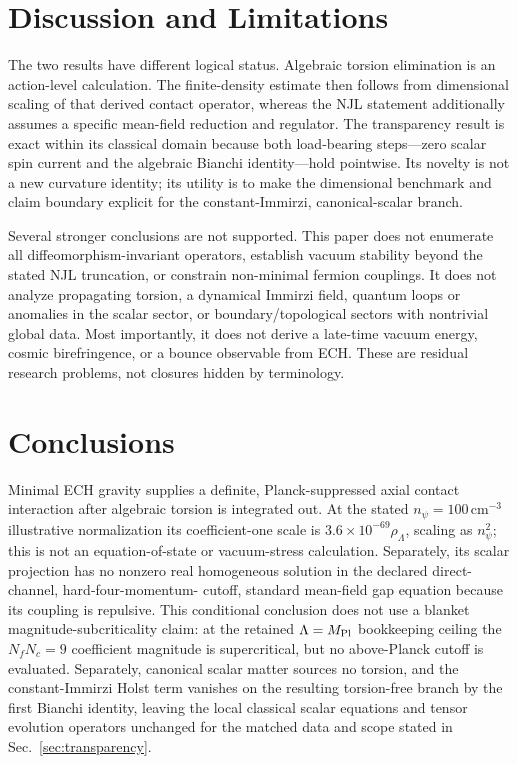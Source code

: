 \documentclass[aps,prd,twocolumn,superscriptaddress,preprintnumbers,nofootinbib,longbibliography,floatfix]{revtex4-2}
\begin{document}
\section{Discussion and Limitations}\label{sec:discussion}

The two results have different logical status.  Algebraic torsion elimination
is an action-level calculation.  The finite-density estimate then follows
from dimensional scaling of that derived contact operator, whereas the NJL
statement additionally assumes a specific mean-field reduction and regulator.
The transparency result is exact within its classical domain because both
load-bearing steps---zero scalar spin current and the algebraic Bianchi
identity---hold pointwise.  Its novelty is not a new curvature identity; its
utility is to make the dimensional benchmark and claim boundary explicit
for the constant-Immirzi, canonical-scalar branch.

Several stronger conclusions are not supported.  This paper does not
enumerate all diffeomorphism-invariant operators, establish vacuum stability
beyond the stated NJL truncation, or constrain non-minimal fermion couplings.
It does not analyze propagating torsion, a dynamical Immirzi field, quantum
loops or anomalies in the scalar sector, or boundary/topological sectors with
nontrivial global data.  Most importantly, it does not derive a late-time
vacuum energy, cosmic birefringence, or a bounce observable from ECH.  These
are residual research problems, not closures hidden by terminology.

\section{Conclusions}\label{sec:conclusions}

Minimal ECH gravity supplies a definite, Planck-suppressed axial contact
interaction after algebraic torsion is integrated out.  At the stated
$n_\psi=100\,\mathrm{cm}^{-3}$ illustrative normalization its coefficient-one
scale is $3.6\times10^{-69}\rho_\Lambda$, scaling as $n_\psi^2$; this is not an
equation-of-state or vacuum-stress calculation.  Separately, its scalar projection has no nonzero
real homogeneous solution in the declared direct-channel, hard-four-momentum-
cutoff, standard mean-field gap equation because its coupling is repulsive.
This conditional conclusion does not use a blanket magnitude-subcriticality
claim: at the retained $\Lambda=M_{\rm Pl}$ bookkeeping ceiling the
$N_fN_c=9$ coefficient magnitude is supercritical, but no above-Planck cutoff
is evaluated.  Separately, canonical
scalar matter sources no torsion, and the constant-Immirzi Holst term vanishes
on the resulting torsion-free branch by the first Bianchi identity, leaving
the local classical scalar equations and tensor evolution operators unchanged
for the matched data and scope stated in Sec.~\ref{sec:transparency}.
\end{document}
